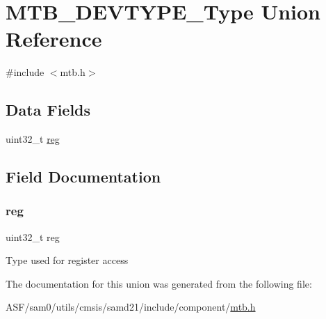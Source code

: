 \hypertarget{union_m_t_b___d_e_v_t_y_p_e___type}{}\section{M\+T\+B\+\_\+\+D\+E\+V\+T\+Y\+P\+E\+\_\+\+Type Union Reference}
\label{union_m_t_b___d_e_v_t_y_p_e___type}


{\ttfamily \#include $<$mtb.\+h$>$}

\subsection*{Data Fields}
\begin{DoxyCompactItemize}
\item 
uint32\+\_\+t \mbox{\hyperlink{union_m_t_b___d_e_v_t_y_p_e___type_a6b91636401516a477989a336376d7b40}{reg}}
\end{DoxyCompactItemize}


\subsection{Field Documentation}
\mbox{\label{union_m_t_b___d_e_v_t_y_p_e___type_a6b91636401516a477989a336376d7b40}} 
\subsubsection{\texorpdfstring{reg}{reg}}
{\footnotesize\ttfamily uint32\+\_\+t reg}

Type used for register access 

The documentation for this union was generated from the following file\+:\begin{DoxyCompactItemize}
\item 
A\+S\+F/sam0/utils/cmsis/samd21/include/component/\mbox{\hyperlink{component_2mtb_8h}{mtb.\+h}}\end{DoxyCompactItemize}
